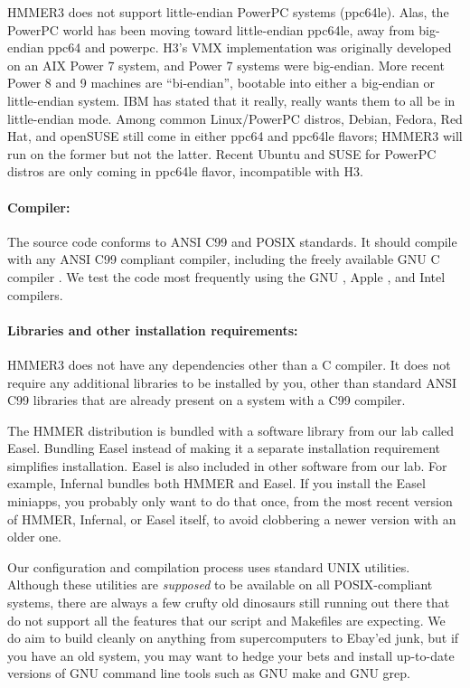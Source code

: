 HMMER3 does not support little-endian PowerPC systems (ppc64le). Alas,
the PowerPC world has been moving toward little-endian ppc64le, away
from big-endian ppc64 and powerpc. H3's VMX implementation was
originally developed on an AIX Power 7 system, and Power 7 systems
were big-endian. More recent Power 8 and 9 machines are ``bi-endian'',
bootable into either a big-endian or little-endian system. IBM has
stated that it really, really wants them to all be in little-endian
mode. Among common Linux/PowerPC distros, Debian, Fedora, Red Hat, and
openSUSE still come in either ppc64 and ppc64le flavors; HMMER3 will
run on the former but not the latter. Recent Ubuntu and SUSE for
PowerPC distros are only coming in ppc64le flavor, incompatible with
H3.

\paragraph{Compiler:} The source code conforms to ANSI
C99 and POSIX standards. It should compile with any ANSI C99 compliant
compiler, including the freely available GNU C compiler .
We test the code most frequently using the GNU , Apple
, and Intel  compilers.


\paragraph{Libraries and other installation requirements:}
HMMER3 does not have any dependencies other than a C compiler.  It
does not require any additional libraries to be installed by you,
other than standard ANSI C99 libraries that are already present on a
system with a C99 compiler.

The HMMER distribution is bundled with a software library from our lab
called Easel.
Bundling Easel instead of making it a separate installation
requirement simplifies installation. Easel is also included in other
software from our lab. For example,
Infernal
bundles both HMMER and Easel. If you install the Easel miniapps, you
probably only want to do that once, from the most recent version of
HMMER, Infernal, or Easel itself, to avoid clobbering a newer version
with an older one.

Our configuration and compilation process uses standard UNIX
utilities. Although these utilities are \emph{supposed} to be
available on all POSIX-compliant systems, there are always a few
crufty old dinosaurs still running out there that do not support all
the features that our  script and Makefiles are
expecting. We do aim to build cleanly on anything from supercomputers
to Ebay'ed junk, but if you have an old system, you may want to hedge
your bets and install up-to-date versions of GNU command line tools
such as GNU make and GNU grep.

